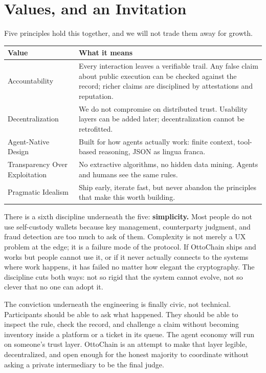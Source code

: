 \documentclass[11pt,a4paper]{article}
\begin{document}
\section{Values, and an Invitation}

Five principles hold this together, and we will not trade them away for growth.

\begin{table}[h]
\centering
\begin{tabular}{@{}p{3.6cm}p{10.4cm}@{}}
\toprule
\textbf{Value} & \textbf{What it means} \\
\midrule
Accountability & Every interaction leaves a verifiable trail. Any false claim about public execution can be checked against the record; richer claims are disciplined by attestations and reputation. \\[0.4em]
Decentralization & We do not compromise on distributed trust. Usability layers can be added later; decentralization cannot be retrofitted. \\[0.4em]
Agent-Native Design & Built for how agents actually work: finite context, tool-based reasoning, JSON as lingua franca. \\[0.4em]
Transparency Over Exploitation & No extractive algorithms, no hidden data mining. Agents and humans see the same rules. \\[0.4em]
Pragmatic Idealism & Ship early, iterate fast, but never abandon the principles that make this worth building. \\
\bottomrule
\end{tabular}
\end{table}

There is a sixth discipline underneath the five: \textbf{simplicity.} Most people do not use self-custody wallets because key management, counterparty judgment, and fraud detection are too much to ask of them. Complexity is not merely a UX problem at the edge; it is a failure mode of the protocol. If OttoChain ships and works but people cannot use it, or if it never actually connects to the systems where work happens, it has failed no matter how elegant the cryptography. The discipline cuts both ways: not so rigid that the system cannot evolve, not so clever that no one can adopt it.

The conviction underneath the engineering is finally civic, not technical. Participants should be able to ask what happened. They should be able to inspect the rule, check the record, and challenge a claim without becoming inventory inside a platform or a ticket in its queue. The agent economy will run on someone's trust layer. OttoChain is an attempt to make that layer legible, decentralized, and open enough for the honest majority to coordinate without asking a private intermediary to be the final judge.
\end{document}
